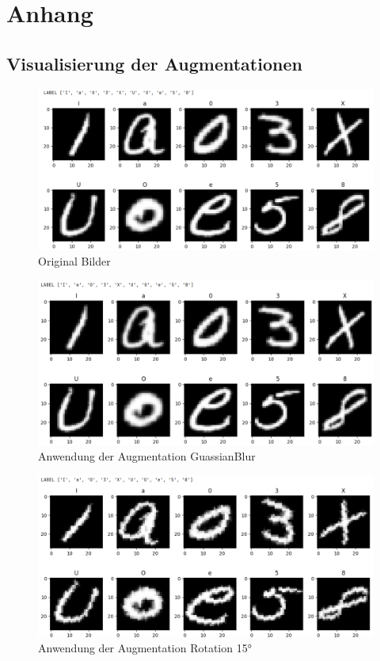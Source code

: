 \documentclass[12pt,oneside]{article}
\begin{document}
  
  \clearpage %
  \section{Anhang}
  
  \subsection{Visualisierung der Augmentationen}
  \label{subsec:augmentation-visualization}
  \begin{figure}[h!]
  	\centering
  	\includegraphics[width=0.7\linewidth]{Bilder/Augmentation_No.png}
  	\caption[GaussianBlur]{Original Bilder}
  	\label{fig:Augmentation_No}
  \end{figure}
  
  \begin{figure}[h!]
  	\centering
  	\includegraphics[width=0.7\linewidth]{Bilder/Augmentation_GuassianBlur.png}
  	\caption[Anwendung der Augmentation GuassianBlur]{Anwendung der Augmentation GuassianBlur}
  	\label{fig:Augment_GuassianBlur}
  \end{figure}
  
    \begin{figure}[h!]
  	\centering
  	\includegraphics[width=0.7\linewidth]{Bilder/Augmentation_Rotation_15.png}
  	\caption[Anwendung der Augmentation Rotation 15°]{Anwendung der Augmentation Rotation 15°}
  	\label{fig:Augment_Rotation}
  \end{figure}
  
\end{document}
